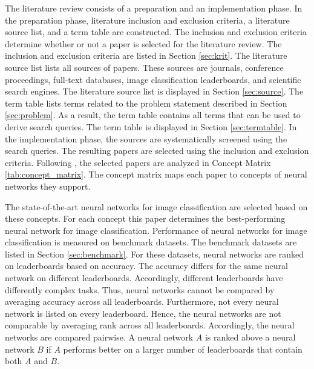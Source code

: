 The literature review consists of a preparation and an implementation phase.
In the preparation phase, literature inclusion and exclusion criteria, a literature source list, and a term table are constructed.
The inclusion and exclusion criteria determine whether or not a paper is selected for the literature review. The inclusion and exclusion criteria are listed in Section \ref{sec:krit}.
The literature source list lists all sources of papers. These sources are journals, conference proceedings, full-text databases, image classification leaderboards, and scientific search engines. The literature source list is displayed in Section \ref{sec:source}.
The term table lists terms related to the problem statement described in Section \ref{sec:problem}. As a result, the term table contains all terms that can be used to derive search queries. The term table is displayed in Section \ref{sec:termtable}.
In the implementation phase, the sources are systematically screened using the search queries. The resulting papers are selected using the inclusion and exclusion criteria. Following \cite{Webster.2002}, the selected papers are analyzed in Concept Matrix \ref{tab:concept_matrix}. The concept matrix maps each paper to concepts of neural networks they support.
\par
The state-of-the-art neural networks for image classification are selected based on these concepts. For each concept this paper determines the best-performing neural network for image classification. Performance of neural networks for image classification is measured on benchmark datasets. The benchmark datasets are listed in Section \ref{sec:benchmark}. For these datasets, neural networks are ranked on leaderboards based on accuracy. The accuracy differs for the same neural network on different leaderboards. Accordingly, different leaderboards have differently complex tasks. Thus, neural networks cannot be compared by averaging accuracy across all leaderboards. Furthermore, not every neural network is listed on every leaderboard. \autocites{imagenet.2019}{cifar.2012}{mnist.2010}{svhn.2011}{clothing.2016}{fashionMNIST.2017}{Darlow.2018}{food.2014}{vanHorn.2018}{stanfordcars.2013}{emnistletters.2017}{kuzushijiMNIST.2018}{cub.2011}{Sabour.2017}{isic1.2019}{isic2.2018}{isic3.2018} Hence, the neural networks are not comparable by averaging rank across all leaderboards. Accordingly, the neural networks are compared pairwise. A neural network $A$ is ranked above a neural network $B$ if $A$ performs better on a larger number of leaderboards that contain both $A$ and $B$.
\par
